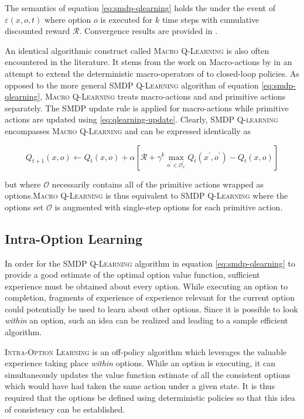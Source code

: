 The semantics of equation \ref{eq:smdp-qlearning} holds the under the event of
$\varepsilon(x, o, t)$ where option $o$ is executed for $k$ time steps with cumulative
discounted reward $\mathcal{R}$. Convergence results are provided in \cite{Parr1998}.

An identical algorithmic construct called \textsc{Macro Q-Learning} is also often
encountered in the literature. It stems from the work on Macro-actions by
\cite{Mcgovern1997} in an attempt to extend the deterministic macro-operators of
\cite{Korf1985} to closed-loop policies. As opposed to the more general \textsc{SMDP Q-Learning} algorithm of equation \ref{eq:smdp-qlearning}, \textsc{Macro Q-Learning} treats macro-actions and
and primitive actions separately. The SMDP update rule is applied for macro-actions
while primitive actions are updated using \ref{eq:qlearning-update}. Clearly, \textsc{SMDP Q-learning} encompasses \textsc{Macro Q-Learning} and can be expressed identically as

\begin{equation}
Q_{t+1}(x, o) \leftarrow Q_{t}(x, o) + \alpha \left[ \mathcal{R} + \gamma^k
\max_{o^\prime \in \mathcal{O}_x^\prime} Q_{t}(x^\prime, o^\prime) -
Q_t(x, o) \right]
\end{equation}

but where $\mathcal{O}$ necessarily contains all of the primitive actions wrapped as options.\textsc{Macro Q-Learning} is thus equivalent to \textsc{SMDP Q-Learning} where the
options set $\mathcal{O}$ is augmented with single-step options for each primitive
action.

\subsection{Intra-Option Learning}

In order for the \textsc{SMDP Q-Learning} algorithm in equation \ref{eq:smdp-qlearning} to provide a
good estimate of the optimal option value function, sufficient experience must be
obtained about every option. While executing an option to completion, fragments of experience of experience relevant for the current option could potentially be used to learn about other options. Since  it is possible to look \textit{within} an option, such an idea can be realized and leading to a sample efficient algorithm.

\textsc{Intra-Option Learning} is an off-policy algorithm which leverages the valuable
experience taking place \textit{within} options. While an option is executing, it can simultaneously
updates the value function estimate of all the consistent options which would have had
taken the same action under a given state. It is thus required that the options be
defined using deterministic policies so that this idea of consistency can be established. 

